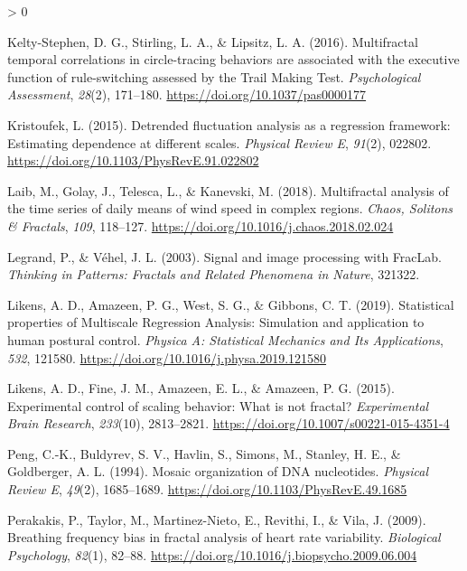 \documentclass[
  english,
  man]{apa6}
\newlength{\cslhangindent}
\newenvironment{CSLReferences}[2] %
 {%
  \setlength{\parindent}{0pt}
  \ifodd #1 \everypar{\setlength{\hangindent}{\cslhangindent}}\ignorespaces\fi
  \ifnum #2 > 0
  \setlength{\parskip}{#2\baselineskip}
  \fi
 }%
 {}
\begin{document}
\begin{CSLReferences}{1}{0}
\leavevmode\hypertarget{ref-kelty-stephenMultifractalTemporalCorrelations2016}{}%
Kelty-Stephen, D. G., Stirling, L. A., \& Lipsitz, L. A. (2016). Multifractal temporal correlations in circle-tracing behaviors are associated with the executive function of rule-switching assessed by the {Trail} {Making} {Test}. \emph{Psychological Assessment}, \emph{28}(2), 171--180. \url{https://doi.org/10.1037/pas0000177}

\leavevmode\hypertarget{ref-kristoufekDetrendedFluctuationAnalysis2015}{}%
Kristoufek, L. (2015). Detrended fluctuation analysis as a regression framework: {Estimating} dependence at different scales. \emph{Physical Review E}, \emph{91}(2), 022802. \url{https://doi.org/10.1103/PhysRevE.91.022802}

\leavevmode\hypertarget{ref-laibMultifractalAnalysisTime2018}{}%
Laib, M., Golay, J., Telesca, L., \& Kanevski, M. (2018). Multifractal analysis of the time series of daily means of wind speed in complex regions. \emph{Chaos, Solitons \& Fractals}, \emph{109}, 118--127. \url{https://doi.org/10.1016/j.chaos.2018.02.024}

\leavevmode\hypertarget{ref-legrand2003}{}%
Legrand, P., \& Véhel, J. L. (2003). Signal and image processing with FracLab. \emph{Thinking in Patterns: Fractals and Related Phenomena in Nature}, 321322.

\leavevmode\hypertarget{ref-likensStatisticalPropertiesMultiscale2019}{}%
Likens, A. D., Amazeen, P. G., West, S. G., \& Gibbons, C. T. (2019). Statistical properties of {Multiscale} {Regression} {Analysis}: {Simulation} and application to human postural control. \emph{Physica A: Statistical Mechanics and Its Applications}, \emph{532}, 121580. \url{https://doi.org/10.1016/j.physa.2019.121580}

\leavevmode\hypertarget{ref-likensExperimentalControlScaling2015}{}%
Likens, A. D., Fine, J. M., Amazeen, E. L., \& Amazeen, P. G. (2015). Experimental control of scaling behavior: What is not fractal? \emph{Experimental Brain Research}, \emph{233}(10), 2813--2821. \url{https://doi.org/10.1007/s00221-015-4351-4}

\leavevmode\hypertarget{ref-pengMosaicOrganizationDNA1994}{}%
Peng, C.-K., Buldyrev, S. V., Havlin, S., Simons, M., Stanley, H. E., \& Goldberger, A. L. (1994). Mosaic organization of {DNA} nucleotides. \emph{Physical Review E}, \emph{49}(2), 1685--1689. \url{https://doi.org/10.1103/PhysRevE.49.1685}

\leavevmode\hypertarget{ref-perakakis2009}{}%
Perakakis, P., Taylor, M., Martinez-Nieto, E., Revithi, I., \& Vila, J. (2009). Breathing frequency bias in fractal analysis of heart rate variability. \emph{Biological Psychology}, \emph{82}(1), 82--88. \url{https://doi.org/10.1016/j.biopsycho.2009.06.004}


\end{CSLReferences}
\end{document}
